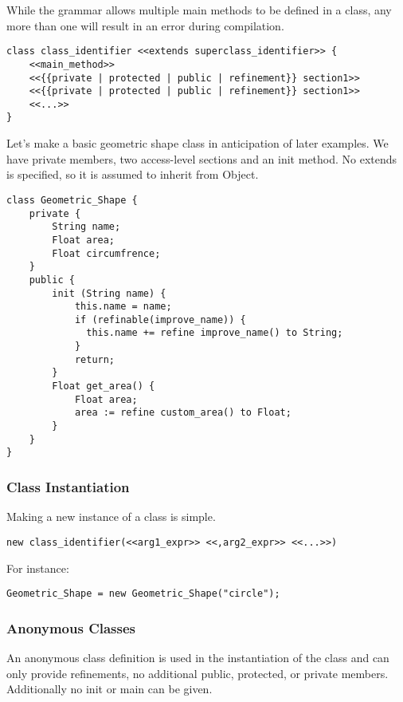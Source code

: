 While the grammar allows multiple main methods to be defined in a class, any more than one will result in an error during compilation.

\begin{lstlisting}
class class_identifier <<extends superclass_identifier>> {
    <<main_method>>
    <<{{private | protected | public | refinement}} section1>>
    <<{{private | protected | public | refinement}} section1>>
    <<...>>
}
\end{lstlisting}

Let's make a basic geometric shape class in anticipation of later examples. We have private members, two access-level sections and an init method. No extends is specified, so it is assumed to inherit from Object.


\begin{lstlisting}[backgroundcolor=\color{tintedorange},label=Method Invocation,caption=Class Declaration for a Geometric Shape class]
class Geometric_Shape {
    private {
        String name;
        Float area;
        Float circumfrence;
    }
    public {
        init (String name) {
            this.name = name;
            if (refinable(improve_name)) {
              this.name += refine improve_name() to String;
            }
            return;
        }
        Float get_area() {
            Float area;
            area := refine custom_area() to Float;
        }
    }
}
\end{lstlisting}

\subsubsection{Class Instantiation}
Making a new instance of a class is simple.

\begin{lstlisting}
new class_identifier(<<arg1_expr>> <<,arg2_expr>> <<...>>)
\end{lstlisting}

For instance:

\begin{lstlisting}[backgroundcolor=\color{tintedorange},label=Method Invocation,caption=Class Instantiation for a Geometric Shape class]
Geometric_Shape = new Geometric_Shape("circle");
\end{lstlisting}

\subsubsection{Anonymous Classes}
An anonymous class definition is used in the instantiation of the class and can only provide refinements, no additional public, protected, or private members. Additionally no init or main can be given.


